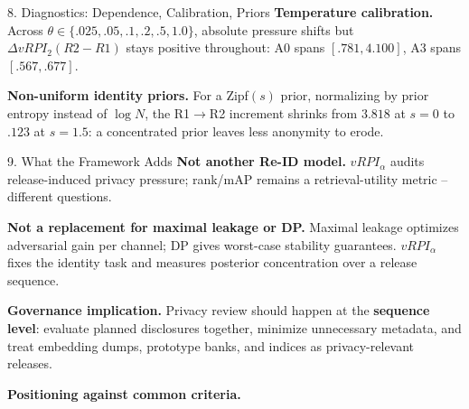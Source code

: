\documentclass[final]{article}
\newcommand{\fsBody}{\fontsize{25}{29}}   %
\newcommand{\fsSmall}{\fontsize{20}{24}}  %
\newcommand{\smallbody}{\fsBody\selectfont}
\newcommand{\tablefont}{\fsSmall\selectfont}
\newcommand{\mhead}[1]{\textbf{\color{navy}#1}}
\begin{document}
\begin{minipage}[t]{\textwidth}
\begin{minipage}[t]{0.292\textwidth}
\begin{sectionbox}{8. Diagnostics: Dependence, Calibration, Priors}
\vspace{0.115in}
\mhead{Temperature calibration.} Across $\theta\in\{.025,.05,.1,.2,.5,1.0\}$, absolute pressure shifts but $\Delta vRPI_2(R2\!-\!R1)$ stays positive throughout: A0 spans $[.781,4.100]$, A3 spans $[.567,.677]$.

\vspace{0.115in}
\mhead{Non-uniform identity priors.} For a Zipf$(s)$ prior, normalizing by prior entropy instead of $\log N$, the R1$\rightarrow$R2 increment shrinks from $3.818$ at $s=0$ to $.123$ at $s=1.5$: a concentrated prior leaves less anonymity to erode.
\end{sectionbox}

\vspace{0.09in}
\begin{sectionbox}{9. What the Framework Adds}
\smallbody\linespread{1.12}\selectfont
\mhead{Not another Re-ID model.} $vRPI_\alpha$ audits release-induced privacy pressure; rank/mAP remains a retrieval-utility metric -- different questions.

\vspace{0.115in}
\mhead{Not a replacement for maximal leakage or DP.} Maximal leakage optimizes adversarial gain per channel; DP gives worst-case stability guarantees. $vRPI_\alpha$ fixes the identity task and measures posterior concentration over a release sequence.

\vspace{0.115in}
\mhead{Governance implication.} Privacy review should happen at the \textbf{sequence level}: evaluate planned disclosures together, minimize unnecessary metadata, and treat embedding dumps, prototype banks, and indices as privacy-relevant releases.

\vspace{0.115in}
\mhead{Positioning against common criteria.}\par
{\tablefont
\renewcommand{\arraystretch}{1.12}
}


\end{sectionbox}
\end{minipage}
\end{minipage}
\end{document}
